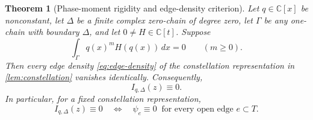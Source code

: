 \documentclass[11pt]{article}
\numberwithin{equation}{section}
\newtheorem{theorem}{Theorem}[section]
\theoremstyle{definition}
\theoremstyle{remark}
\newcommand{\C}{\mathbb C}
\begin{document}
\begin{theorem}[Phase-moment rigidity and edge-density criterion]
\label{thm:phase-moment-rigidity}
Let $q\in\C[x]$ be nonconstant, let $\Delta$ be a finite complex zero-chain of
degree zero, let $\Gamma$ be any one-chain with boundary $\Delta$, and let
$0\ne H\in\C[t]$.  Suppose
\begin{equation}\label{eq:general-phase-moments}
  \int_\Gamma q(x)^mH(q(x))\,dx=0
  \qquad(m\ge0).
\end{equation}
Then every edge density \eqref{eq:edge-density} of the constellation
representation in \cref{lem:constellation} vanishes identically.  Consequently,
\begin{equation}\label{eq:period-zero-conclusion}
  I_{q,\Delta}(z)\equiv0.
\end{equation}
In particular, for a fixed constellation representation,
\begin{equation}\label{eq:edge-criterion}
  I_{q,\Delta}(z)\equiv0
  \quad\Longleftrightarrow\quad
  \psi_e\equiv0\ \text{ for every open edge }e\subset T.
\end{equation}
\end{theorem}
\end{document}
